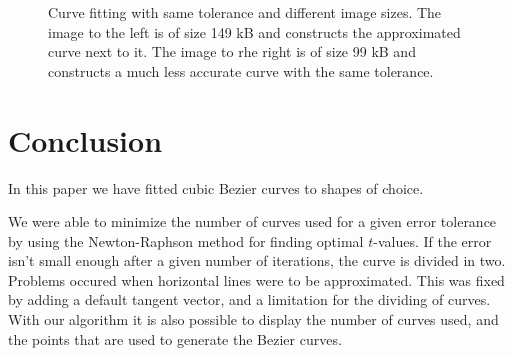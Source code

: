\documentclass[10pt]{article}
\begin{document}
\begin{figure}
\begin{minipage}[t]{.24\textwidth}
\end{minipage}\hfill
\caption{Curve fitting with same tolerance and different image sizes. The image to the left is of size 149 kB and constructs the approximated curve next to it. The image to rhe right is of size 99 kB and constructs a much less accurate curve with the same tolerance.}
\label{fig:mickey}
\end{figure}





\section*{Conclusion}
In this paper we have fitted cubic Bezier curves to shapes of choice.

We were able to minimize the number of curves used for a given error tolerance by using the Newton-Raphson method for finding optimal $t$-values. If the error isn't small enough after a given number of iterations, the curve is divided in two. Problems occured when horizontal lines were to be approximated. This was fixed by adding a default tangent vector, and a limitation for the dividing of curves. With our algorithm it is also possible to display the number of curves used, and the points that are used to generate the Bezier curves.


\cite{Plass:1983}


\end{document}
